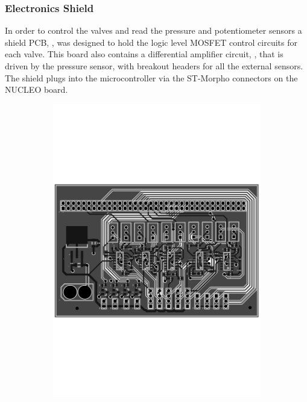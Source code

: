 \documentclass[11pt,a4paper]{article}
\begin{document}
\subsubsection{Electronics Shield}
\label{sub:shield}

In order to control the valves and read the pressure and potentiometer sensors a shield PCB, , was designed to hold the logic level MOSFET control circuits for each valve. This board also contains a differential amplifier circuit, , that is driven by the pressure sensor, with breakout headers for all the external sensors. The shield plugs into the microcontroller via the ST-Morpho connectors on the NUCLEO board.

\begin{figure}[!hbt]
    \begin{subfigure}[t]{0.45\textwidth}
        \centering
        \includegraphics[angle=270, origin=c, clip, trim=0cm 8cm 0cm 8cm, width=1.00\textwidth]{ShieldPCB.pdf}

\end{subfigure}
\end{figure}
\end{document}
